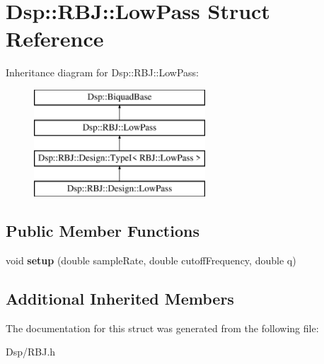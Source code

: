 \hypertarget{structDsp_1_1RBJ_1_1LowPass}{\section{Dsp\-:\-:R\-B\-J\-:\-:Low\-Pass Struct Reference}
\label{structDsp_1_1RBJ_1_1LowPass}
}
Inheritance diagram for Dsp\-:\-:R\-B\-J\-:\-:Low\-Pass\-:\begin{figure}[H]
\begin{center}
\leavevmode
\includegraphics[height=4.000000cm]{structDsp_1_1RBJ_1_1LowPass}
\end{center}
\end{figure}
\subsection*{Public Member Functions}
\begin{DoxyCompactItemize}
\item 
\hypertarget{structDsp_1_1RBJ_1_1LowPass_a91f815dbbd5d40e5c63a47cbfcd46613}{void {\bfseries setup} (double sample\-Rate, double cutoff\-Frequency, double q)}\label{structDsp_1_1RBJ_1_1LowPass_a91f815dbbd5d40e5c63a47cbfcd46613}

\end{DoxyCompactItemize}
\subsection*{Additional Inherited Members}


The documentation for this struct was generated from the following file\-:\begin{DoxyCompactItemize}
\item 
Dsp/R\-B\-J.\-h\end{DoxyCompactItemize}
